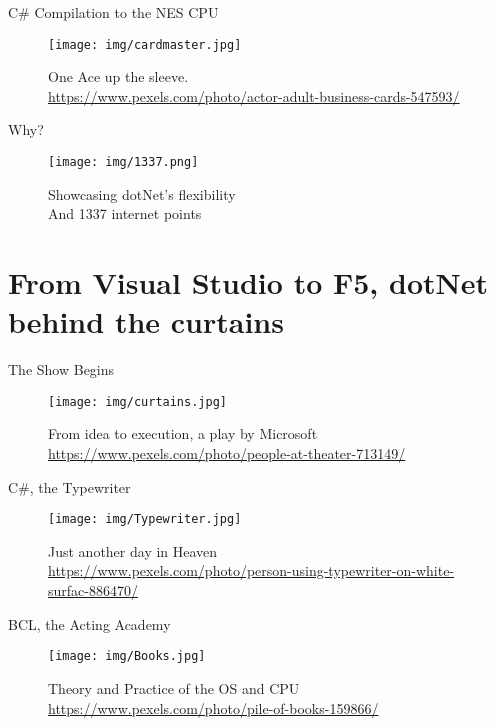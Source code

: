 \documentclass[10pt]{beamer}
\begin{document}
\begin{frame}{C\# Compilation to the NES CPU}
    \begin{figure}
        \centering
        \texttt{[image: img/cardmaster.jpg]}
        \caption{One Ace up the sleeve. \\ \tiny{\href{Photo by Nikolai Ivanov from Pexels}{https://www.pexels.com/photo/actor-adult-business-cards-547593/}}}
    \end{figure}
\end{frame}

\begin{frame}{Why?}
    \begin{figure}
        \centering
        \texttt{[image: img/1337.png]}
        \caption{Showcasing dotNet's flexibility \\ \tiny{And 1337 internet points}}
    \end{figure}
\end{frame}

\section{From Visual Studio to F5, dotNet behind the curtains}
\begin{frame}{The Show Begins}
    \begin{figure}
        \centering
        \texttt{[image: img/curtains.jpg]}
        \caption{From idea to execution, a play by Microsoft \\ \tiny{\href{Photo by Monica Silvestre from Pexels}{https://www.pexels.com/photo/people-at-theater-713149/}}}
    \end{figure}
\end{frame}

\begin{frame}{C\#, the Typewriter}
    \begin{figure}
        \centering
        \texttt{[image: img/Typewriter.jpg]}
        \caption{Just another day in Heaven \\ \tiny{\href{Photo by rawpixel.com from Pexels}{https://www.pexels.com/photo/person-using-typewriter-on-white-surfac-886470/}}}
    \end{figure}
\end{frame}

\begin{frame}{BCL, the Acting Academy}
    \begin{figure}
        \centering
        \texttt{[image: img/Books.jpg]}
        \caption{Theory and Practice of the OS and CPU \\ \tiny{\href{Photo by Pixabay from Pexels}{https://www.pexels.com/photo/pile-of-books-159866/}}}
    \end{figure}
\end{frame}
\end{document}
